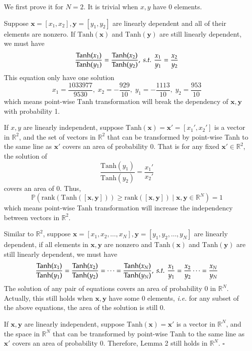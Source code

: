 \documentclass{article}
\newcommand\ie{\textit{i.e.}}
\newcommand\st{\textit{s.t.}}
\newcommand\doubleP{\mathbb{P}}
\newenvironment{proof}{{\noindent\it Proof}\quad}{\hfill $\square$\par}
\begin{document}
\begin{proof}
We first prove it for $N=2$. It is trivial when $x,y$ have 0 elements.

Suppose $\bm{x} = [x_1, x_2] ,\bm{y} = [y_1, y_2]$ are linearly dependent and all of their elements are nonzero. If $\text{Tanh}(\bm{x})$ and $\text{Tanh}(\bm{y})$ are still linearly dependent, we must have
$$ \frac{\text{Tanh}(x_1)}{\text{Tanh}(y_1)} = \frac{\text{Tanh}(x_2)}{\text{Tanh}(y_2)}, \text{ \st{} } \frac{x_1}{y_1} = \frac{x_2}{y_2} $$
This equation only have one solution
$$x_1 = \frac{1033977}{9530},\; x_2 = -\frac{929}{10} ,\; y_1 = -\frac{1113}{10}, \; y_2 = \frac{953}{10}$$
which means point-wise $\text{Tanh}$ transformation will break the dependency of $\bm{x},\bm{y}$ with probability 1. %

If $x,y$ are linearly independent, suppose $\text{Tanh}(\bm{x}) = \bm{x'} = [x_1', x_2']$ is a vector in $\mathbb{R}^2$, and the set of vectors in $\mathbb{R}^2$ that can be transformed by point-wise Tanh to the same line as $\bm{x'}$ covers an area of probability 0. That is for any fixed $\bm{x'} \in \mathbb{R}^2$, the solution of
$$\frac{\text{Tanh}(y_1)}{\text{Tanh}(y_2)} = \frac{x_1'}{x_2'}$$
covers an area of 0. Thus,
$$ \doubleP(\text{rank}\left(\text{Tanh}([\bm{x},\bm{y}])\right) \geq \text{rank}([\bm{x},\bm{y}]) \;|\; \bm{x},\bm{y} \in \mathbb{R}^N) = 1 $$
which means point-wise Tanh transformation will increase the independency between vectors in $\mathbb{R}^2$.

Similar to $\mathbb{R}^2$, suppose $\bm{x} = [x_1, x_2, \dots, x_N] ,\bm{y} = [y_1, y_2, \dots, y_N]$ are linearly dependent, if all elements in $\bm{x}, \bm{y}$ are nonzero and $\text{Tanh}(\bm{x})$ and $\text{Tanh}(\bm{y})$ are still linearly dependent, we must have
$$ \frac{\text{Tanh}(x_1)}{\text{Tanh}(y_1)} = \frac{\text{Tanh}(x_2)}{\text{Tanh}(y_2)} = \cdots = \frac{\text{Tanh}(x_N)}{\text{Tanh}(y_N)}, \text{ \st{} } \frac{x_1}{y_1} = \frac{x_2}{y_2} \cdots = \frac{x_N}{y_N} $$
The solution of any pair of equations covers an area of probability 0 in $\mathbb{R}^N$. Actually, this still holds when $\bm{x},\bm{y}$ have some 0 elements, \ie{} for any subset of the above equations, the area of the solution is still 0.

If $\bm{x},\bm{y}$ are linearly independent, suppose $\text{Tanh}(\bm{x}) = \bm{x'}$ is a vector in $\mathbb{R}^N$, and the space in $\mathbb{R}^N$ that can be transformed by point-wise $\text{Tanh}$ to the same line as $\bm{x'}$ covers an area of probability 0. Therefore, Lemma 2 still holds in $\mathbb{R}^N$.
\end{proof}
\end{document}
